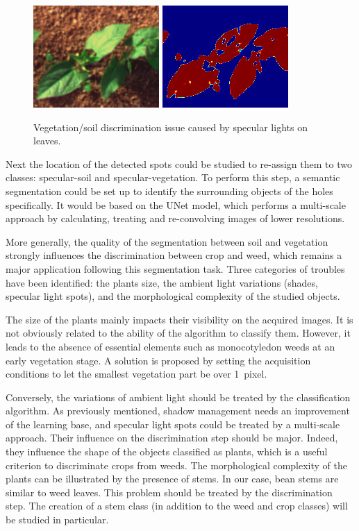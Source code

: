 \documentclass[../thesis.tex]{subfiles}
\begin{document}
	\begin{figure}[H]
		\centering
		\includegraphics[width=0.3\linewidth]{img/idx/0020-false}
		\includegraphics[width=0.3\linewidth]{img/idx/0020}
		\caption{Vegetation/soil discrimination issue caused by specular lights on leaves.}
		\label{fig:bad-specular}
	\end{figure}
	
	Next the location of the detected spots could be studied to re-assign them to two classes: specular-soil and specular-vegetation. To perform this step, a semantic segmentation could be set up to identify the surrounding objects of the holes specifically. It would be based on the UNet model, which performs a multi-scale approach by calculating, treating and re-convolving images of lower resolutions.
	
	More generally, the quality of the segmentation between soil and vegetation strongly influences the discrimination between crop and weed, which remains a major application following this segmentation task. Three categories of troubles have been identified: the plants size, the ambient light variations (shades, specular light spots), and the morphological complexity of the studied objects.
	
	The size of the plants mainly impacts their visibility on the acquired images. It is not obviously related to the ability of the algorithm to classify them. However, it leads to the absence of essential elements such as monocotyledon weeds at an early vegetation stage. A solution is proposed by setting the acquisition conditions to let the smallest vegetation part be over \mbox{1 pixel.}
	
	Conversely, the variations of ambient light should be treated by the classification algorithm. As previously mentioned, shadow management needs an improvement of the learning base, and specular light spots could be treated by a multi-scale approach. Their influence on the discrimination step should be major. Indeed, they influence the shape of the objects classified as plants, which is a useful criterion to discriminate crops from weeds. 
	The morphological complexity of the plants can be illustrated by the presence of stems. In our case, bean stems are similar to weed leaves. This problem should be treated by the discrimination step. The creation of a stem class (in addition to the weed and crop classes) will be studied in particular.
	
\end{document}
